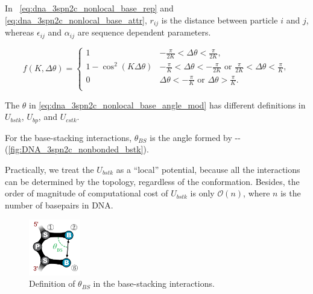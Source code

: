 In ~\autoref{eq:dna_3spn2c_nonlocal_base_rep} and
\autoref{eq:dna_3spn2c_nonlocal_base_attr}, $r_{ij}$ is the distance between
particle $i$ and $j$, whereas $\epsilon_{ij}$ and $\alpha_{ij}$ are sequence
dependent parameters.

\begin{equation}
  \label{eq:dna_3spn2c_nonlocal_base_angle_mod}
  f(K, \Delta \theta) =
  \begin{cases}
    1 & \displaystyle -\frac{\pi}{2K} < \Delta \theta < \frac{\pi}{2K}, \\[.7em]
    1 - \cos^2(K\Delta\theta) & \displaystyle -\frac{\pi}{K} < \Delta \theta < -\frac{\pi}{2K} \textrm{ or } \frac{\pi}{2K} < \Delta \theta < \frac{\pi}{K}, \\[.7em]
    0 & \displaystyle \Delta \theta < -\frac{\pi}{K} \textrm{ or }  \Delta \theta > \frac{\pi}{K}. \\
  \end{cases}
\end{equation}

The $\theta$ in \autoref{eq:dna_3spn2c_nonlocal_base_angle_mod} has
different definitions in $U_{bstk}$, $U_{bp}$, and $U_{cstk}$.

For the base-stacking interactions, $\theta_{BS}$ is the angle formed by
--
(\autoref{fig:DNA_3spn2c_nonbonded_bstk}).

Practically, we treat the $U_{bstk}$ as a ``local'' potential, because all the
interactions can be determined by the topology, regardless of the conformation.
Besides, the order of magnitude of computational cost of $U_{bstk}$ is only
$\mathcal{O}(n)$, where $n$ is the number of basepairs in DNA.

\begin{figure}[ht]
  \centering
  \includegraphics[width=0.2\textwidth]{figures/DNA_3spn2c_nonbonded_bstk.png}
  \caption{Definition of $\theta_{BS}$ in the base-stacking interactions.}
  \label{fig:DNA_3spn2c_nonbonded_bstk}
\end{figure}

